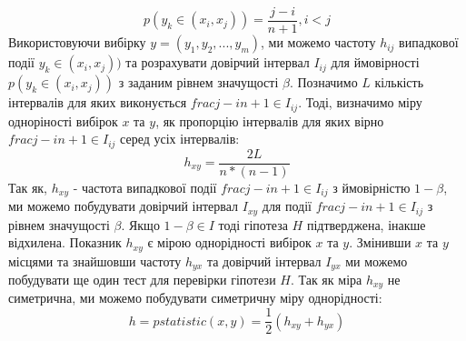 \documentclass[12pt, a4paper]{extarticle}
\begin{document}
\begin{equation}\label{eq:9}
p(y_k \in (x_i, x_j)) = \frac{j-i}{n+1}, i<j
\end{equation}
Використовуючи вибірку $y=(y_1, y_2,...,y_m)$, ми можемо частоту $h_{ij}$ випадкової події $y_k \in (x_i, x_j))$ та розрахувати довірчий інтервал $I_{ij}$ для ймовірності $p(y_k \in (x_i, x_j))$ з заданим рівнем значущості $\beta$.
Позначимо $L$ кількість інтервалів для яких виконується $frac{j-i}{n+1} \in I_{ij}$. Тоді, визначимо міру одноріності вибірок $x$ та $y$, як пропорцію інтервалів для яких вірно $frac{j-i}{n+1} \in I_{ij}$ серед усіх інтервалів:
\begin{equation}\label{eq:10}
h_{xy} = \frac{2L}{n*(n-1)}
\end{equation}
Так як, $h_{xy}$ - частота випадкової події $frac{j-i}{n+1} \in I_{ij}$ з  ймовірністю $1-\beta$, ми можемо побудувати довірчий інтервал $I_{xy}$ для події $frac{j-i}{n+1} \in I_{ij}$ з рівнем значущості $\beta$. Якщо $1-\beta \in I$ тоді гіпотеза $H$ підтверджена, інакше відхилена. Показник $h_{xy}$ є мірою однорідності вибірок $x$ та $y$. Змінивши $x$ та $y$ місцями та знайшовши частоту $h_{yx}$ та довірчий інтервал $I_{yx}$ ми можемо побудувати ще один тест для перевірки гіпотези $H$. Так як міра $h_{xy}$ не симетрична, ми можемо побудувати симетричну міру однорідності:
\begin{equation}\label{eq:11}
h = pstatistic(x,y) = \frac{1}{2}(h_{xy}+h_{yx})
\end{equation}
\end{document}
